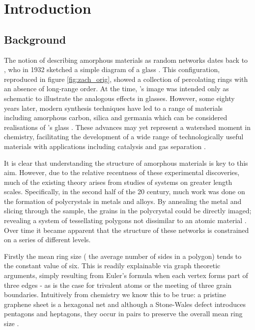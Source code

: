 \chapter{Introduction}
\label{ch:intro}

\section{Background}
\label{s:background}

The notion of describing amorphous materials as random networks dates back to \zach, who in 1932 sketched a simple diagram of a \td{} glass \cite{Zachariasen1932}.
This configuration, reproduced in figure \ref{fig:zach_orig}, showed a collection of percolating rings with an absence of long\--range order.
At the time, \zach's image was intended only as schematic to illustrate the analogous effects in \thd{} glasses.
However, some eighty years later, modern synthesis techniques have led to a range of \td{} materials including amorphous carbon, silica and germania which can be considered realisations of \zach's glass \cite{Kotakoski2011,Robertson2012,Huang2012,Lichtenstein2012a,Shaikhutdinov2013,Lewandowski2018,Lewandowski2019}.
These advances may yet represent a watershed moment in chemistry, facilitating the development of a wide range of technologically useful materials with applications including catalysis and gas separation \cite{Trogadas2014,Sun2015a,Buchner2017}.

It is clear that understanding the structure of amorphous materials is key to this aim.
However, due to the relative recentness of these experimental discoveries, much of the existing theory arises from studies of systems on greater length scales.
Specifically, in the second half of the 20\th{} century, much work was done  on the formation of polycrystals in metals and alloys.
By annealing the metal and slicing through the sample, the grains in the polycrystal could be directly imaged; revealing a system of tessellating polygons not dissimilar to an atomic material \cite{Beck1954,Dunn1957}.
Over time it became apparent that the structure of these networks is constrained on a series of different levels.

Firstly the mean ring size (\ie{} the average number of sides in a polygon) tends to the constant value of six.
This is readily explainable via graph theoretic arguments, simply resulting from Euler's formula when each vertex forms part of three edges - as is the case for trivalent atoms or the meeting of three grain boundaries.
Intuitively from chemistry we know this to be true: a pristine graphene sheet is a hexagonal net and although a Stone\--Wales defect introduces pentagons and heptagons, they occur in pairs to preserve the overall mean ring size \cite{Stone1986}.

